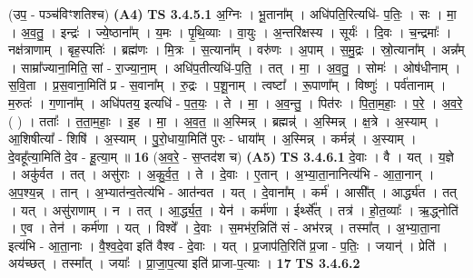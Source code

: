 \documentclass[17pt]{extarticle}
\begin{document}
                  \newline
                      (उप॒ - पञ्च॑विꣳशतिश्च)  \textbf{(A4)} \newline \newline
                                \textbf{ TS 3.4.5.1} \newline
                  अ॒ग्निः । भू॒ताना᳚म् । अधि॑पति॒रित्यधि॑- प॒तिः॒ । सः । मा॒ । अ॒व॒तु॒ । इन्द्रः॑ । ज्ये॒ष्ठाना᳚म् । य॒मः । पृ॒थि॒व्याः । वा॒युः । अ॒न्तरि॑क्षस्य । सूर्यः॑ । दि॒वः । च॒न्द्रमाः᳚ । नक्ष॑त्राणाम् । बृह॒स्पतिः॑ । ब्रह्म॑णः । मि॒त्रः । स॒त्याना᳚म् । वरु॑णः । अ॒पाम् । स॒मु॒द्रः । स्रो॒त्याना᳚म् । अन्न᳚म् । साम्रा᳚ज्याना॒मिति॒ सां - रा॒ज्या॒ना॒म् । अधि॑प॒तीत्यधि॑-प॒ति॒ । तत् । मा॒ । अ॒व॒तु॒ । सोमः॑ । ओष॑धीनाम् । स॒वि॒ता । प्र॒स॒वाना॒मिति॑ प्र - स॒वाना᳚म् । रु॒द्रः । प॒शू॒नाम् । त्वष्टा᳚ । रू॒पाणा᳚म् । विष्णुः॑ । पर्व॑तानाम् । म॒रुतः॑ । ग॒णाना᳚म् । अधि॑पतय॒ इत्यधि॑ - प॒त॒यः॒ । ते । मा॒ । अ॒व॒न्तु॒ । पित॑रः । पि॒ता॒म॒हाः॒ । प॒रे॒ । अ॒व॒रे॒ ( ) । तताः᳚ । त॒ता॒म॒हाः॒ । इ॒ह । मा॒ । अ॒व॒त॒ ॥ अ॒स्मिन्न् । ब्रह्मन्न्॑ । अ॒स्मिन्न् । क्ष॒त्रे । अ॒स्याम् । आ॒शिषीत्या᳚ - शिषि॑ । अ॒स्याम् । पु॒रो॒धाया॒मिति॑ पुरः - धाया᳚म् । अ॒स्मिन्न् । कर्मन्न्॑ । अ॒स्याम् । दे॒वहू᳚त्या॒मिति॑ दे॒व - हू॒त्या॒म् ॥ \textbf{  16} \newline
                  \newline
                      (अ॒व॒रे॒ - स॒प्तद॑श च)  \textbf{(A5)} \newline \newline
                                \textbf{ TS 3.4.6.1} \newline
                  दे॒वाः । वै । यत् । य॒ज्ञे । अकु॑र्वत । तत् । असु॑राः । अ॒कु॒र्व॒त॒ । ते । दे॒वाः । ए॒तान् । अ॒भ्या॒ता॒नानित्य॑भि - आ॒ता॒नान् । अ॒प॒श्य॒न्न् । तान् । अ॒भ्यात॑न्व॒तेत्य॑भि - आत॑न्वत । यत् । दे॒वाना᳚म् । कर्म॑ । आसी᳚त् । आर्द्ध्य॑त । तत् । यत् । असु॑राणाम् । न । तत् । आ॒र्द्ध्य॒त॒ । येन॑ । कर्म॑णा । ईर्थ्से᳚त् । तत्र॑ । हो॒त॒व्याः᳚ । ऋ॒द्ध्नोति॑ । ए॒व । तेन॑ । कर्म॑णा । यत् । विश्वे᳚ । दे॒वाः । स॒मभ॑र॒न्निति॑ सं - अभ॑रन्न् । तस्मा᳚त् । अ॒भ्या॒ता॒ना इत्य॑भि - आ॒ता॒नाः । वै॒श्व॒दे॒वा इति॑ वैश्व - दे॒वाः । यत् । प्र॒जाप॑ति॒रिति॑ प्र॒जा - प॒तिः॒ । जयान्॑ । प्रेति॑ । अय॑च्छत् । तस्मा᳚त् । जयाः᳚ । प्रा॒जा॒प॒त्या इति॑ प्राजा-प॒त्याः । \textbf{  17} \newline
                  \newline
                                \textbf{ TS 3.4.6.2} \newline
\end{document}
